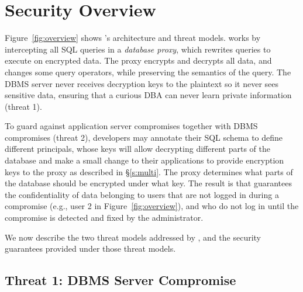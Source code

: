 
\section{Security Overview}
\label{s:model}

Figure~\ref{fig:overview} shows \name's architecture and threat
models.  \name{} works by intercepting all SQL queries in a {\em
  database proxy}, which rewrites queries to execute on encrypted
data.  The proxy encrypts and decrypts all data, and changes some
query operators, while preserving the semantics of the query.
The DBMS server never receives decryption keys to the plaintext so it
never sees sensitive data, ensuring that a curious DBA can never
learn private information (threat 1).


To guard against application server compromises together with DBMS compromises (threat 2), developers
may annotate their SQL schema to define different principals, whose
keys will allow decrypting different parts of the database and make a small change to their applications to provide
encryption keys to the proxy as described in \S\ref{s:multi}.  
The
\name{} proxy determines what parts of the database should be
encrypted under what key.  The result is that \name guarantees the
confidentiality of data belonging to users that are not logged in
during a compromise (e.g., user 2 in Figure~\ref{fig:overview}), and
who do not log in until the compromise is detected and fixed by
the administrator.

We now describe the two threat models addressed by \name{}, and the
security guarantees provided under those threat models.


\subsection{Threat 1: DBMS Server Compromise}
\label{ss:dbthreat}


